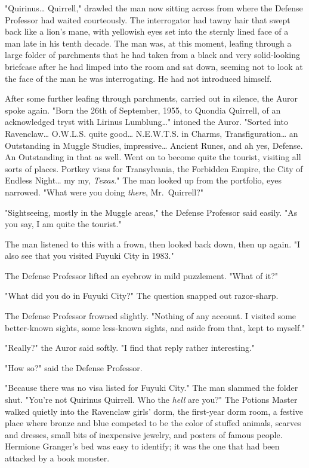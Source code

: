 "Quirinus{\ldots} Quirrell," drawled the man now sitting across from where the 
Defense Professor had waited courteously. The interrogator had tawny hair that 
swept back like a lion's mane, with yellowish eyes set into the sternly lined 
face of a man late in his tenth decade. The man was, at this moment, leafing 
through a large folder of parchments that he had taken from a black and very 
solid-looking briefcase after he had limped into the room and sat down, seeming 
not to look at the face of the man he was interrogating. He had not introduced 
himself.

After some further leafing through parchments, carried out in silence, the 
Auror spoke again. "Born the 26th of September, 1955, to Quondia Quirrell, of 
an acknowledged tryst with Lirinus Lumblung{\ldots}" intoned the Auror. "Sorted 
into Ravenclaw{\ldots} O.W.L.S. quite good{\ldots} N.E.W.T.S. in Charms, 
Transfiguration{\ldots} an Outstanding in Muggle Studies, impressive{\ldots} 
Ancient Runes, and ah yes, Defense. An Outstanding in that as well. Went on to 
become quite the tourist, visiting all sorts of places. Portkey visas for 
Transylvania, the Forbidden Empire, the City of Endless Night{\ldots} my my, 
\emph{Texas}." The man looked up from the portfolio, eyes narrowed. "What were 
you doing \emph{there}, Mr.~Quirrell?"

"Sightseeing, mostly in the Muggle areas," the Defense Professor said easily. 
"As you say, I am quite the tourist."

The man listened to this with a frown, then looked back down, then up again. "I 
also see that you visited Fuyuki City in 1983."

The Defense Professor lifted an eyebrow in mild puzzlement. "What of it?"

"What did you do in Fuyuki City?" The question snapped out razor-sharp.

The Defense Professor frowned slightly. "Nothing of any account. I visited some 
better-known sights, some less-known sights, and aside from that, kept to 
myself."

"Really?" the Auror said softly. "I find that reply rather interesting."

"How so?" said the Defense Professor.

"Because there was no visa listed for Fuyuki City." The man slammed the folder 
shut. "You're not Quirinus Quirrell. Who the \emph{hell} are you?"
\sbreak
The Potions Master walked quietly into the Ravenclaw girls' dorm, the 
first-year dorm room, a festive place where bronze and blue competed to be the 
color of stuffed animals, scarves and dresses, small bits of inexpensive 
jewelry, and posters of famous people. Hermione Granger's bed was easy to 
identify; it was the one that had been attacked by a book monster.

